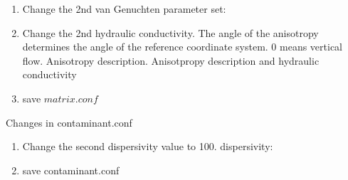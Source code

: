 \documentclass[
10pt, %
a4paper, %
oneside, %
headinclude,footinclude, %
BCOR5mm, %
]{scrartcl}
\begin{document}
\begin{enumerate}
	\item Change the 2nd van Genuchten parameter set: \\ 
	\item Change the 2nd hydraulic conductivity. The angle of the anisotropy determines the angle of the reference coordinate system. 0 means vertical flow. Anisotropy description. Anisotpropy description and hydraulic conductivity\\ 
	\item save $matrix.conf$
\end{enumerate}

Changes in contaminant.conf
\begin{enumerate}
	\item Change the second dispersivity value to 100.
		dispersivity: \\ 
	\item save contaminant.conf
\end{enumerate}
\end{document}
